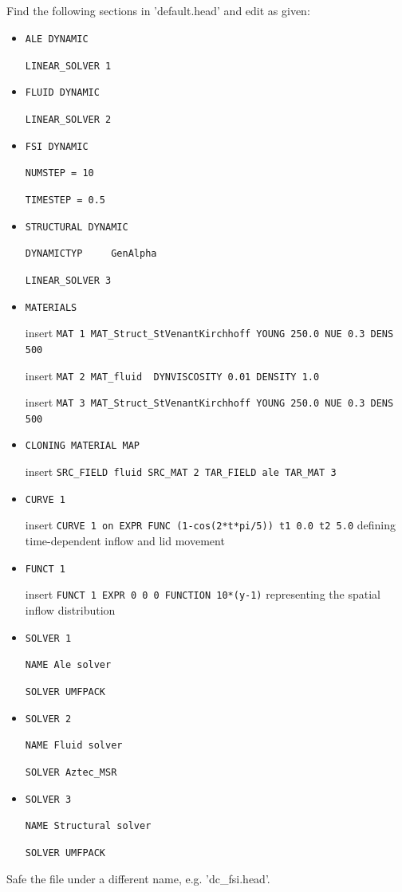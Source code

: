 \subsection{\head}
Find the following sections in 'default.head' and edit as given:
\begin{itemize}

 \item \verb|ALE DYNAMIC|

 \verb|LINEAR_SOLVER 1|

 \item \verb|FLUID DYNAMIC|

 \verb|LINEAR_SOLVER 2|

 \item \verb|FSI DYNAMIC|

 \verb|NUMSTEP = 10|

 \verb|TIMESTEP = 0.5|

 \item \verb|STRUCTURAL DYNAMIC|

 \verb|DYNAMICTYP     GenAlpha|

 \verb|LINEAR_SOLVER 3|

 \item \verb|MATERIALS|

  insert \verb|MAT 1 MAT_Struct_StVenantKirchhoff YOUNG 250.0 NUE 0.3 DENS 500|
  
  insert \verb|MAT 2 MAT_fluid  DYNVISCOSITY 0.01 DENSITY 1.0|

  insert \verb|MAT 3 MAT_Struct_StVenantKirchhoff YOUNG 250.0 NUE 0.3 DENS 500|

  \item \verb|CLONING MATERIAL MAP|

  insert \verb|SRC_FIELD fluid SRC_MAT 2 TAR_FIELD ale TAR_MAT 3|

  \item \verb|CURVE 1|

  insert \verb|CURVE 1 on EXPR FUNC (1-cos(2*t*pi/5)) t1 0.0 t2 5.0| defining time-dependent inflow and lid movement
 
  \item \verb|FUNCT 1|

  insert \verb|FUNCT 1 EXPR 0 0 0 FUNCTION 10*(y-1)| representing the spatial inflow distribution

 \item \verb|SOLVER 1|
 
 \verb|NAME Ale solver|

 \verb|SOLVER UMFPACK|

 \item \verb|SOLVER 2|
 
 \verb|NAME Fluid solver|

 \verb|SOLVER Aztec_MSR|

 \item \verb|SOLVER 3|
 
 \verb|NAME Structural solver|

 \verb|SOLVER UMFPACK|

\end{itemize}
Safe the file under a different name, e.g. 'dc\_fsi.head'.

